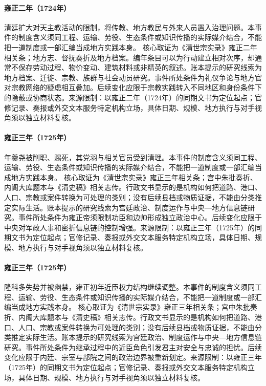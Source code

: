 \hypertarget{civic:EQ-1724-CATHOLIC-PROSCRIPTION}{}\paragraph{雍正二年（1724年）}清廷扩大对天主教活动的限制，将传教、地方教民与外来人员置入治理问题。本事件的制度含义须同工程、运输、劳役、生态条件或知识传播的实际媒介结合，不能把一道制度或一部汇编当成地方实践本身。 核心取证为《清世宗实录》雍正二年相关条；地方志、督抚奏折及地方档案。编年条目可以为行动建立相对次序，却通常不保存劳动过程、物价变动、建筑材料或非精英的叙述。账本提示的研究线索为地方档案、迁徙、宗教、族群与社会动员研究。事件所处条件为礼仪争论与地方官对宗教网络的疑虑相互叠加。后续变化应限于宗教实践转入不同地区和身份条件下的隐蔽或协商状态。来源限制：以雍正二年（1724年）的同期文书为定位起点；官修记录、奏报或外交文本服务特定机构立场，具体日期、规模、地方执行与对手视角须以独立材料复核。
\hypertarget{civic:EQ-1725-NIAN-GENGYAO-PUNISHMENT}{}\paragraph{雍正三年（1725年）}年羹尧被削职、赐死，其党羽与相关官员受到清理。本事件的制度含义须同工程、运输、劳役、生态条件或知识传播的实际媒介结合，不能把一道制度或一部汇编当成地方实践本身。 核心取证为《清世宗实录》雍正三年相关条；宫中朱批奏折、内阁大库题本与《清史稿》相关志传。行政文书显示的是机构如何把道路、港口、人口、宗教或案件转换为可处理的类别；没有后续县档或物质证据，不能由分类推定实际生活。账本提示的研究线索为宫廷政治、制度运作与中央—地方信息链研究。事件所处条件为雍正帝须限制功臣和边帅形成独立政治中心。后续变化应限于中央对军政人事和密折信息链的控制增强。来源限制：以雍正三年（1725年）的同期文书为定位起点；官修记录、奏报或外交文本服务特定机构立场，具体日期、规模、地方执行与对手视角须以独立材料复核。
\hypertarget{civic:EQ-1725-TAN-TEBI-CASE}{}\paragraph{雍正三年（1725年）}隆科多失势并被幽禁，雍正初年近臣权力结构继续调整。本事件的制度含义须同工程、运输、劳役、生态条件或知识传播的实际媒介结合，不能把一道制度或一部汇编当成地方实践本身。 核心取证为《清世宗实录》雍正三年相关条；宫中朱批奏折、内阁大库题本与《清史稿》相关志传。行政文书显示的是机构如何把道路、港口、人口、宗教或案件转换为可处理的类别；没有后续县档或物质证据，不能由分类推定实际生活。账本提示的研究线索为宫廷政治、制度运作与中央—地方信息链研究。事件所处条件为继承过程中的近臣角色引发君主对安全与忠诚的担忧。后续变化应限于内廷、宗室与部院之间的政治边界被重新划定。来源限制：以雍正三年（1725年）的同期文书为定位起点；官修记录、奏报或外交文本服务特定机构立场，具体日期、规模、地方执行与对手视角须以独立材料复核。
